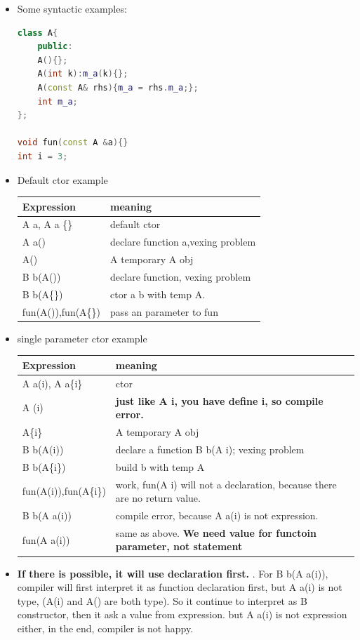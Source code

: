 \documentclass[a4paper,12pt,twoside]{book}
\begin{document}
\begin{itemize}
	
	\item Some syntactic examples: \newline
\begin{lstlisting}[frame=single, language=c++]
class A{
	public:
	A(){};
	A(int k):m_a(k){};
	A(const A& rhs){m_a = rhs.m_a;};
	int m_a;
};
	
void fun(const A &a){}
int i = 3;
\end{lstlisting}
	
	\item Default ctor example \newline
	\begin{tabular}{|p{}|p{}|}
		\hline
		Expression & meaning \\
		\hline
		A a, A a \{\} & default ctor \\
		\hline
		A a() & declare function a,vexing problem \\
		\hline
		A() & A temporary A obj\\
		\hline
		B b(A()) & declare function, vexing problem \\
		\hline
		B b(A\{\}) & ctor a b with temp A. \\
		\hline
		fun(A()),fun(A\{\}) & pass an parameter to fun\\
		\hline
	\end{tabular}
	\item single parameter ctor example \newline
	
	\begin{tabular}{|p{}|p{}|}
		\hline
		Expression & meaning \\
		\hline
		A a(i), A a\{i\} & ctor\\
		\hline
		A (i) & \textbf{just like A i, you have define i, so compile error.} \\
		\hline
		A\{i\} & A temporary A obj\\
		\hline
		B b(A(i)) & declare a function B b(A i); vexing problem \\
		\hline
		B b(A\{i\}) & build b with temp A\\
		\hline
		fun(A(i)),fun(A\{i\}) & work, fun(A i) will not a declaration, because there are no return value.\\
		\hline
		B b(A a(i))  & compile error, because A a(i) is not expression. \\
		\hline
		fun(A a(i)) & same as above. \textbf{We need value for functoin parameter, not statement} \\
		\hline
	\end{tabular}
	
	\item \textbf{If there is possible, it will use declaration first. }. For B b(A a(i)), compiler will first interpret it as function declaration first, but A a(i) is not type, (A(i) and A() are both type). So it continue to interpret as B constructor, then it ask a value from expression. but A a(i) is not expression either, in the end, compiler is not happy. 
	
\end{itemize}
\end{document}
